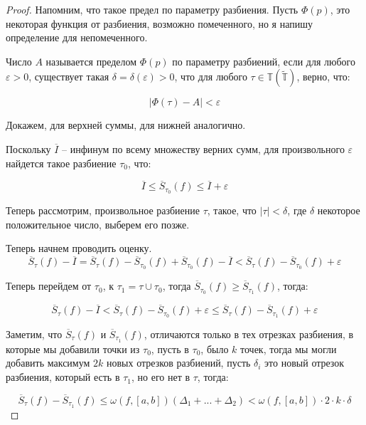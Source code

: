 \documentclass{article}
\theoremstyle{plain}
\theoremstyle{definition}
\theoremstyle{remark}
\renewcommand{\*}{\cdot}
\begin{document}
\begin{proof}
    Напомним, что такое предел по параметру разбиения. Пусть $\Phi(p)$, это некоторая функция от разбиения, возможно помеченного, 
    но я напишу определение для непомеченного. 
    
    Число $A$ называется пределом $\Phi(p)$ по параметру разбиений, если  для 
    любого $\varepsilon > 0$, существует такая $\delta = \delta(\varepsilon) > 0$, 
    что для любого $\tau \in \mathbb{T} (\mathbb{ \widetilde{T}})$, верно, что:

    \[
        \left| \Phi(\tau) - A \right| < \varepsilon
    \]

    Докажем, для верхней суммы, для нижней аналогично.

    Поскольку $\overline{I}$ -- инфинум по всему множеству верних сумм, для произвольного $\varepsilon$ найдется такое разбиение $\tau_0$, что:

    \[
    \overline{I} \leq \overline{S}_{\tau_0}(f) \leq \overline{I} + \varepsilon
    \]

    Теперь рассмотрим, произвольное разбиение $\tau$, такое, что $|\tau| < \delta$, где $\delta$ некоторое положительное число, выберем его позже.

    Теперь начнем проводить оценку.
    \[
        \overline{S}_{\tau}(f) - \overline{I} = \overline{S}_{\tau}(f) - \overline{S}_{\tau_0}(f) + \overline{S}_{\tau_0}(f) - \overline{I} < 
        \overline{S}_{\tau}(f) - \overline{S}_{\tau_0}(f) + \varepsilon
    \]

    Теперь перейдем от $\tau_0$, к $\tau_1 = \tau \cup \tau_0$, тогда $\overline{S}_{\tau_0}(f) \geq \overline{S}_{\tau_1}(f)$, тогда:

    \[
        \overline{S}_{\tau}(f) - \overline{I}  < 
        \overline{S}_{\tau}(f) - \overline{S}_{\tau_0}(f) + \varepsilon \leq 
        \overline{S}_{\tau}(f) - \overline{S}_{\tau_1}(f) + \varepsilon
    \]

    Заметим, что $\overline{S}_{\tau}(f) $ и $\overline{S}_{\tau_1}(f)$, отличаются только 
    в тех отрезках разбиения, в которые мы добавили точки из $\tau_0$, пусть в $\tau_0$, было $k$ точек, 
    тогда мы могли добавить максимум $2k$ новых отрезков разбиений, пусть $\delta_i$ это новый отрезок разбиения, 
    который есть в $\tau_1$, но его нет в $\tau$, тогда:
    
    \[ 
        \overline{S}_{\tau}(f)  - \overline{S}_{\tau_1}(f) \leq \omega(f, [a,b]) (\Delta_1 + ... + \Delta_2) < \omega(f, [a,b]) \* 2 \* k \* \delta
    \]


\end{proof}
\end{document}
